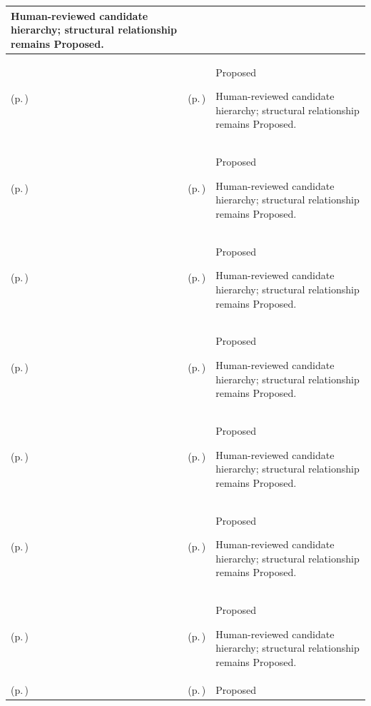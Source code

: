 \begin{longtable}{|>{\raggedright\arraybackslash}p{0.27\TableWidth}|>{\raggedright\arraybackslash}p{0.27\TableWidth}|>{\raggedright\arraybackslash}p{0.46\TableWidth}|}
Human-reviewed candidate hierarchy; structural relationship remains Proposed.\\\hline
\nameref{cap:bec-episode-encounter-administration} (p.\,\pageref{cap:bec-episode-encounter-administration}) & \nameref{cap:bec-acute-care} (p.\,\pageref{cap:bec-acute-care}) & Proposed

Human-reviewed candidate hierarchy; structural relationship remains Proposed.\\\hline
\nameref{cap:bec-emergency-department-operations} (p.\,\pageref{cap:bec-emergency-department-operations}) & \nameref{cap:bec-emergency-care} (p.\,\pageref{cap:bec-emergency-care}) & Proposed

Human-reviewed candidate hierarchy; structural relationship remains Proposed.\\\hline
\nameref{cap:bec-ward-operations} (p.\,\pageref{cap:bec-ward-operations}) & \nameref{cap:bec-inpatient-care} (p.\,\pageref{cap:bec-inpatient-care}) & Proposed

Human-reviewed candidate hierarchy; structural relationship remains Proposed.\\\hline
\nameref{cap:bec-reviewed-clinical-service-dependency-management} (p.\,\pageref{cap:bec-reviewed-clinical-service-dependency-management}) & \nameref{cap:bec-ambulatory-care} (p.\,\pageref{cap:bec-ambulatory-care}) & Proposed

Human-reviewed candidate hierarchy; structural relationship remains Proposed.\\\hline
\nameref{cap:bec-reviewed-clinical-service-dependency-management} (p.\,\pageref{cap:bec-reviewed-clinical-service-dependency-management}) & \nameref{cap:bec-surgical-procedural-care} (p.\,\pageref{cap:bec-surgical-procedural-care}) & Proposed

Human-reviewed candidate hierarchy; structural relationship remains Proposed.\\\hline
\nameref{cap:bec-diagnostic-administration} (p.\,\pageref{cap:bec-diagnostic-administration}) & \nameref{cap:bec-diagnostic-services} (p.\,\pageref{cap:bec-diagnostic-services}) & Proposed

Human-reviewed candidate hierarchy; structural relationship remains Proposed.\\\hline
\nameref{cap:bec-reviewed-clinical-service-dependency-management} (p.\,\pageref{cap:bec-reviewed-clinical-service-dependency-management}) & \nameref{cap:bec-therapeutic-services} (p.\,\pageref{cap:bec-therapeutic-services}) & Proposed

Human-reviewed candidate hierarchy; structural relationship remains Proposed.\\\hline
\nameref{cap:bec-medication-administration} (p.\,\pageref{cap:bec-medication-administration}) & \nameref{cap:bec-medication-therapy} (p.\,\pageref{cap:bec-medication-therapy}) & Proposed


\end{longtable}
